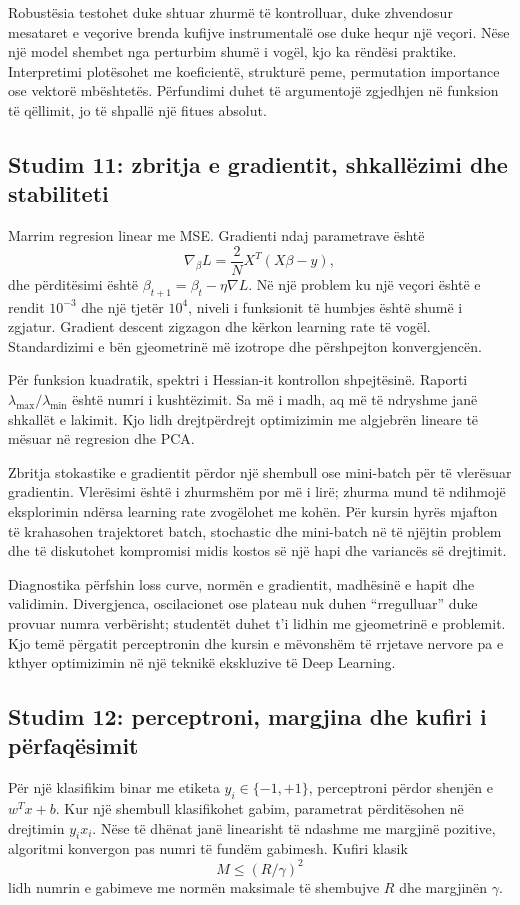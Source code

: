 \documentclass[12pt,a4paper,oneside]{book}
\begin{document}
Robustësia testohet duke shtuar zhurmë të kontrolluar, duke zhvendosur mesataret e veçorive brenda kufijve instrumentalë ose duke hequr një veçori. Nëse një model shembet nga perturbim shumë i vogël, kjo ka rëndësi praktike. Interpretimi plotësohet me koeficientë, strukturë peme, permutation importance ose vektorë mbështetës. Përfundimi duhet të argumentojë zgjedhjen në funksion të qëllimit, jo të shpallë një fitues absolut.

\subsection*{Studim 11: zbritja e gradientit, shkallëzimi dhe stabiliteti}
Marrim regresion linear me MSE. Gradienti ndaj parametrave është
\[
\nabla_\beta L=\frac{2}{N}X^T(X\beta-y),
\]
dhe përditësimi është $\beta_{t+1}=\beta_t-\eta\nabla L$. Në një problem ku një veçori është e rendit $10^{-3}$ dhe një tjetër $10^4$, niveli i funksionit të humbjes është shumë i zgjatur. Gradient descent zigzagon dhe kërkon learning rate të vogël. Standardizimi e bën gjeometrinë më izotrope dhe përshpejton konvergjencën.

Për funksion kuadratik, spektri i Hessian-it kontrollon shpejtësinë. Raporti $\lambda_{\max}/\lambda_{\min}$ është numri i kushtëzimit. Sa më i madh, aq më të ndryshme janë shkallët e lakimit. Kjo lidh drejtpërdrejt optimizimin me algjebrën lineare të mësuar në regresion dhe PCA.

Zbritja stokastike e gradientit përdor një shembull ose mini-batch për të vlerësuar gradientin. Vlerësimi është i zhurmshëm por më i lirë; zhurma mund të ndihmojë eksplorimin ndërsa learning rate zvogëlohet me kohën. Për kursin hyrës mjafton të krahasohen trajektoret batch, stochastic dhe mini-batch në të njëjtin problem dhe të diskutohet kompromisi midis kostos së një hapi dhe variancës së drejtimit.

Diagnostika përfshin loss curve, normën e gradientit, madhësinë e hapit dhe validimin. Divergjenca, oscilacionet ose plateau nuk duhen “rregulluar” duke provuar numra verbërisht; studentët duhet t'i lidhin me gjeometrinë e problemit. Kjo temë përgatit perceptronin dhe kursin e mëvonshëm të rrjetave nervore pa e kthyer optimizimin në një teknikë ekskluzive të Deep Learning.

\subsection*{Studim 12: perceptroni, margjina dhe kufiri i përfaqësimit}
Për një klasifikim binar me etiketa $y_i\in\{-1,+1\}$, perceptroni përdor shenjën e $w^Tx+b$. Kur një shembull klasifikohet gabim, parametrat përditësohen në drejtimin $y_ix_i$. Nëse të dhënat janë linearisht të ndashme me margjinë pozitive, algoritmi konvergon pas numri të fundëm gabimesh. Kufiri klasik
\[
M\le (R/\gamma)^2
\]
lidh numrin e gabimeve me normën maksimale të shembujve $R$ dhe margjinën $\gamma$.
\end{document}
